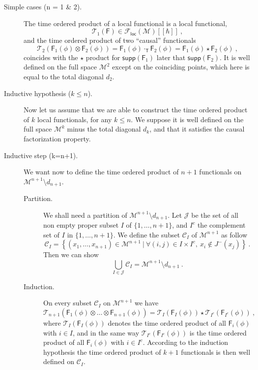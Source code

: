 \documentclass[11pt]{book}
\newcommand{\supp}{\mathsf{supp}}
\newcommand{\loc}{\mathsf{loc}}
\newcommand{\Ccal}{\mathcal{C}}
\newcommand{\Fcal}{\mathcal{F}}
\newcommand{\Jcal}{\mathcal{J}}
\newcommand{\Mcal}{\mathcal{M}}
\newcommand{\Tcal}{\mathcal{T}}
\newcommand{\Fsf}{\mathsf{F}}
\newcommand{\Tsf}{\mathsf{T}}
\theoremstyle{break}
\begin{document}
\begin{description}


\item[Simple cases (n = 1 \& 2).] The time ordered product of a local functional is a local functional,
\begin{equation*}
\Tcal_1(\Fsf) \in \Fcal_\loc(\Mcal)[[\hbar]] \ , 
\end{equation*}
%
and the time ordered product of two ``causal'' functionals 
%
\begin{equation*}
\Tcal_2\left(\Fsf_1(\phi)\otimes\Fsf_2(\phi)\right) = \Fsf_1(\phi) \cdot_\Tsf \Fsf_2(\phi) = \Fsf_1(\phi) \star \Fsf_2(\phi) \ ,
\end{equation*}
%
coincides with the $\star$ product for $\supp(\Fsf_1)$ later that $\supp(\Fsf_2)$. It is well defined on the full space $\Mcal^2$ except on the coinciding points, which here is equal to the total diagonal $d_2$.


\item[Inductive hypothesis ($k\leq n$).] Now let us assume that we are able to construct the time ordered product of $k$ local functionals, for any $k \leq n$. We suppose it is well defined on the full space $\Mcal^k$ minus the total diagonal $d_k$, and that it satisfies the causal factorization property. 


\item[Inductive step (k=n+1).] We want now to define the time ordered product of $n+1$ functionals on $\Mcal^{n+1}\setminus d_{n+1}$.


\begin{description}


\item[Partition.] We shall need a partition of $\Mcal^{n+1}\setminus d_{n+1}$. Let $\Jcal$ be the set of all non empty proper subset $I$ of $\{1,\dots,n+1\}$, and $I^c$ the complement set of $I$ in $\{1,\dots,n+1\}$. We define the subset $\Ccal_I$ of $\Mcal^{n+1}$ as follow
%
\begin{equation*}
\Ccal_I = \left\{ (x_1,\dots,x_{n+1}) \in \Mcal^{n+1} \ | \ \forall (i,j) \in I \times I^c , \ x_i \notin J^-(x_j) \right\} \ .
\end{equation*}
%
Then we can show \cite[lemma 4.1]{BF_2000}
%
\begin{equation*}
\bigcup_{I \in \Jcal} \Ccal_I = \Mcal^{n+1} \setminus d_{n+1} \ .
\end{equation*}


\item[Induction.] On every subset $\Ccal_I$ on $\Mcal^{n+1}$ we have 
%
\begin{equation*}
\Tcal_{n+1}\left(\Fsf_1(\phi) \otimes \dots \otimes \Fsf_{n+1}(\phi) \right) = \Tcal_{I}\left(\Fsf_I(\phi)\right) \star \Tcal_{I^c}\left(\Fsf_{I^c}(\phi)\right) \ , 
\end{equation*}
%
where $\Tcal_{I}\left(\Fsf_I(\phi)\right)$ denotes the time ordered product of all $\Fsf_i(\phi)$ with $i \in I$, and in the same way $\Tcal_{I^c}\left(\Fsf_{I^c}(\phi)\right)$ is the time ordered product of all $\Fsf_i(\phi)$ with $i \in I^c$. According to the induction hypothesis the time ordered product of $k+1$ functionals is then well defined on $\Ccal_I$. 



\end{description}
\end{description}
\end{document}
